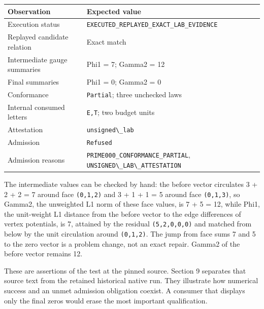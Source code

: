\documentclass[
  11pt,
]{article}
\newcommand{\passthrough}[1]{#1}
\begin{document}
\begin{longtable}[]{@{}
  >{\raggedright\arraybackslash}p{}
  >{\raggedright\arraybackslash}p{}@{}}
\toprule\noalign{}
\begin{minipage}[b]{\linewidth}\raggedright
Observation
\end{minipage} & \begin{minipage}[b]{\linewidth}\raggedright
Expected value
\end{minipage} \\
\midrule\noalign{}
\endhead
\bottomrule\noalign{}
\endlastfoot
Execution status & \nolinkurl{EXECUTED_REPLAYED_EXACT_LAB_EVIDENCE} \\
Replayed candidate relation & Exact match \\
Intermediate gauge summaries & Phi1 = 7; Gamma2 = 12 \\
Final summaries & Phi1 = 0; Gamma2 = 0 \\
Conformance & \passthrough{\lstinline!Partial!}; three unchecked laws \\
Internal consumed letters & \passthrough{\lstinline!E,T!}; two budget
units \\
Attestation & \passthrough{\lstinline!unsigned\_lab!} \\
Admission & \passthrough{\lstinline!Refused!} \\
Admission reasons & \nolinkurl{PRIME000_CONFORMANCE_PARTIAL},
\passthrough{\lstinline!UNSIGNED\_LAB\_ATTESTATION!} \\
\end{longtable}

The intermediate values can be checked by hand: the before vector
circulates 3 + 2 + 2 = 7 around face \passthrough{\lstinline!(0,1,2)!}
and 3 + 1 + 1 = 5 around face \passthrough{\lstinline!(0,1,3)!}, so
Gamma2, the unweighted L1 norm of these face values, is 7 + 5 = 12,
while Phi1, the unit-weight L1 distance from the before vector to the
edge differences of vertex potentials, is 7, attained by the residual
\passthrough{\lstinline!(5,2,0,0,0)!} and matched from below by the unit
circulation around \passthrough{\lstinline!(0,1,2)!}. The jump from
face sums 7 and 5 to the zero vector is a problem change, not an exact
repair. Gamma2 of the before vector remains 12.

These are assertions of the test at the pinned source. Section 9
separates that source text from the retained historical native run. They
illustrate how numerical success and an unmet admission obligation
coexist. A consumer that displays only the final zeros would erase the
most important qualification.
\end{document}
